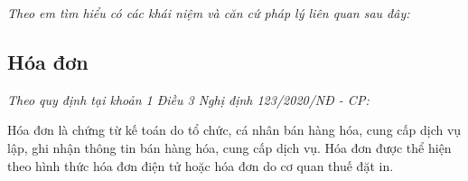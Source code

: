 
\emph{Theo em tìm hiểu có các khái niệm và căn cứ pháp lý liên quan sau đây:}
\subsection{Hóa đơn}
\emph{Theo quy định tại khoản 1 Điều 3 Nghị định 123/2020/NĐ - CP:}

Hóa đơn là chứng từ kế toán do tổ chức, cá nhân bán hàng hóa, cung cấp dịch vụ lập, ghi nhận thông tin bán hàng hóa, cung cấp dịch vụ. Hóa đơn được thể hiện theo hình thức hóa đơn điện tử hoặc hóa đơn do cơ quan thuế đặt in.



% 



% 


% 


% 